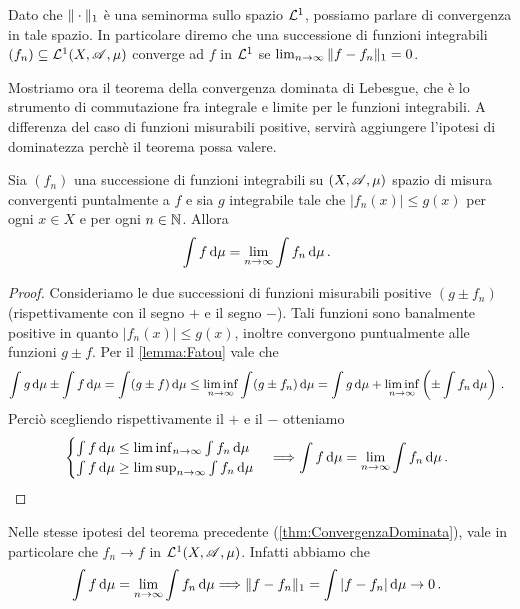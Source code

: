 \begin{remark}
	Dato che $\Vert \cdot\Vert_1$ è una seminorma sullo spazio $\mathcal L^1$, possiamo parlare di convergenza in tale spazio. In particolare diremo che una successione di funzioni integrabili $(f_n)\subseteq \mathcal L^1(X,\mathscr A,\mu)$ converge ad $f$ in $\mathcal L^1$ se $\lim_{n\to\infty}\Vert f-f_n\Vert_1=0$.
\end{remark}

Mostriamo ora il teorema della convergenza dominata di Lebesgue, che è lo strumento di commutazione fra integrale e limite per le funzioni integrabili. A differenza del caso di funzioni misurabili positive, servirà aggiungere l'ipotesi di dominatezza perchè il teorema possa valere.

\begin{theorem}\label{thm:ConvergenzaDominata}
	Sia $(f_n)$ una successione di funzioni integrabili su $(X,\mathscr A,\mu)$ spazio di misura convergenti puntalmente a $f$ e sia $g$ integrabile tale che $|f_n(x)|\le g(x)$ per ogni $x\in X$ e per ogni $n\in\mathbb N$. Allora
	\begin{equation*}
		\int f \,\mathrm d\mu=\lim_{n\to\infty}\int f_n\,\mathrm d\mu\, \text{. }
	\end{equation*}
\end{theorem}
\begin{proof}
	Consideriamo le due successioni di funzioni misurabili positive $(g\pm f_n)$ (rispettivamente con il segno $+$ e il segno $-$). Tali funzioni sono banalmente positive in quanto $|f_n(x)|\le g(x)$, inoltre convergono puntualmente alle funzioni $g\pm f$. Per il \cref{lemma:Fatou} vale che
	\begin{equation*}
		\int g\,\mathrm d\mu\pm\int f\,\mathrm d\mu=\int (g\pm f) \,\mathrm d\mu \le \liminf_{n\to\infty} \int (g\pm f_n) \,\mathrm d\mu=\int g\,\mathrm d\mu +\liminf_{n\to\infty}\left( \pm\int f_n \,\mathrm d \mu\right)\, \text{. }
	\end{equation*}
	Perciò scegliendo rispettivamente il $+$ e il $-$ otteniamo
	\begin{equation*}
		\begin{cases}
			\int f \,\mathrm d\mu\le \liminf_{n\to\infty}\int f_n \,\mathrm d \mu \\
			\int f\,\mathrm d\mu \ge \limsup_{n\to\infty}\int f_n \,\mathrm d \mu
		\end{cases}
		\Longrightarrow \int f\,\mathrm d\mu = \lim_{n\to\infty}\int f_n \,\mathrm d \mu\, \text{. }
	\end{equation*}
\end{proof}

\begin{remark}\label{nota:ConvergenzaL1Dominata}
	Nelle stesse ipotesi del teorema precedente (\cref{thm:ConvergenzaDominata}), vale in particolare che $f_n\to f$ in $\mathcal L^1(X,\mathscr A,\mu)$. Infatti abbiamo che
	\begin{equation*}
		\int f \,\mathrm d\mu=\lim_{n\to\infty}\int f_n\,\mathrm d\mu \Longrightarrow \Vert f-f_n\Vert_1=\int |f-f_n|\,\mathrm d\mu\to 0\, \text{. }
	\end{equation*}
\end{remark}

